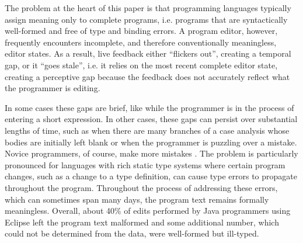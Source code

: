 %
The problem at the heart of this paper is that
programming languages typically assign meaning only to {complete programs}, i.e. programs that are syntactically well-formed and free of type and binding errors. A program editor, however, frequently encounters incomplete, and therefore conventionally meaningless, editor states. As a result, live feedback either ``flickers out'', creating a temporal gap, or it ``goes stale'', i.e. it relies on the most recent complete editor state, creating a perceptive gap because the feedback does not accurately reflect what the programmer is editing.

In some cases these gaps are brief, like while the programmer
is in the process of entering  
a short expression. In other cases, these gaps can persist over substantial lengths of time, such as when there are many branches of a case analysis whose bodies are initially left blank or when the programmer is puzzling over a mistake.
%
Novice programmers, of course, make more mistakes \cite{mccauley2008debugging,fitzgerald2008debugging}.
%
The problem is particularly pronounced for languages with rich static type systems where certain program changes, such as a change to a type definition, can cause type errors to propagate throughout the program. Throughout the process of addressing these errors, which can sometimes span many days, the program text remains formally meaningless. 
Overall, about 40\% of edits performed by Java programmers using Eclipse left the program text malformed \cite{popl-paper,6883030} and some additional number, which could not be determined from the data, were well-formed but ill-typed.


